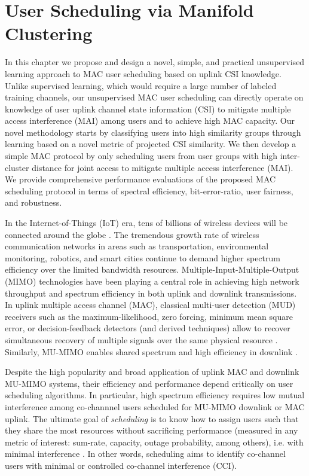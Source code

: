 \chapter{User Scheduling via Manifold Clustering} \label{chap:U-SCH}

In this chapter we propose and design a novel, simple, and practical unsupervised learning approach to MAC user scheduling based on uplink CSI knowledge.
Unlike supervised learning, which would require a large number of labeled training channels, our unsupervised MAC user scheduling can directly operate on knowledge of user uplink channel state information (CSI) to mitigate multiple access interference (MAI) among users and to achieve high MAC capacity. 
Our novel methodology starts by classifying users into high similarity groups through learning based on a novel metric of projected CSI similarity. 
We then develop a simple MAC protocol by only scheduling users from user groups with high inter-cluster distance for joint access to mitigate multiple access interference (MAI). 
We provide comprehensive performance evaluations of the proposed  MAC scheduling protocol in terms of spectral  efficiency, bit-error-ratio, user fairness, and robustness.


In the Internet-of-Things (IoT) era, tens of billions of wireless devices will be connected around the globe \cite{Qualcomm15, Andrews14}. 
The tremendous growth rate of wireless communication networks in areas such as transportation, environmental monitoring, robotics, and smart cities continue to demand higher 
spectrum efficiency over the limited
bandwidth resources.
Multiple-Input-Multiple-Output (MIMO) technologies have been playing a central role in achieving high
network throughput and spectrum efficiency \cite{LTE12}
in both uplink and downlink transmissions.
In uplink multiple access channel (MAC), classical multi-user detection (MUD) receivers such as the maximum-likelihood, zero forcing, minimum mean square error, or decision-feedback detectors (and derived techniques) allow to recover simultaneous recovery of multiple signals over the same physical resource
\cite{Verdu1986a,Vandenameele00, Hanzo03,Verdu1986b, Xu02,Verdu89, Xie90, Madhow94,Heath05}. Similarly, MU-MIMO
enables shared spectrum and high efficiency in downlink \cite{mu-mimo2012}.

Despite the high popularity and broad application of uplink MAC and downlink MU-MIMO systems, 
their
efficiency and performance depend critically on
user scheduling algorithms.  In particular,
high spectrum efficiency requires low
mutual interference among co-channnel
users scheduled for MU-MIMO downlink or 
MAC uplink. 
The ultimate goal of \emph{scheduling} is to know how to assign users such that they share the most resources without sacrificing performance (measured in any metric of interest: sum-rate, capacity, outage probability, among others), i.e. with minimal interference \cite{Goldsmith2003}. In other words, scheduling aims to identify
co-channel users with minimal or controlled co-channel interference (CCI). 

